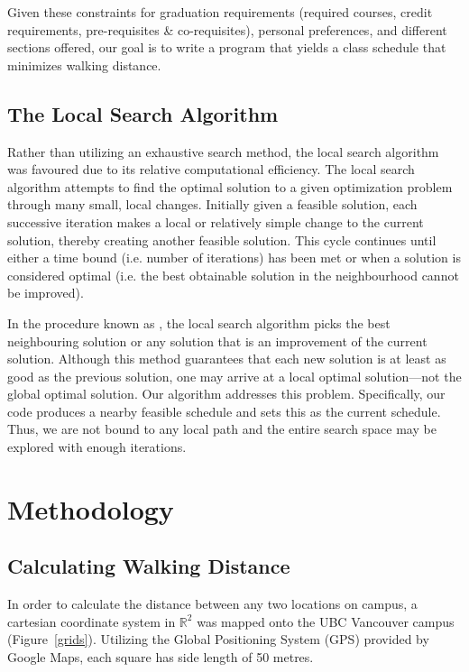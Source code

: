 \documentclass[11pt, oneside]{article}   	%
\begin{document}
Given these constraints for graduation requirements (required courses, credit requirements, pre-requisites \& co-requisites), personal preferences, and different sections offered, our goal is to write a program that yields a class schedule that minimizes walking distance.

\subsection{The Local Search Algorithm}

Rather than utilizing an exhaustive search method, the local search algorithm was favoured due to its relative computational efficiency. The local search algorithm attempts to find the optimal solution to a given optimization problem through many small, local changes. Initially given a feasible solution, each successive iteration makes a local or relatively simple change to the current solution, thereby creating another feasible solution. This cycle continues until either a time bound (i.e. number of iterations) has been met or when a solution is considered optimal (i.e. the best obtainable solution in the neighbourhood cannot be improved).

In the procedure known as , the local search algorithm picks the best neighbouring solution or any solution that is an improvement of the current solution. Although this method guarantees that each new solution is at least as good as the previous solution, one may arrive at a local optimal solution---not the global optimal solution. Our algorithm addresses this problem. Specifically, our code  produces a nearby feasible schedule and sets this as the current schedule. Thus, we are not bound to any local path and the entire search space may be explored with enough iterations.

\cleardoublepage
\section{Methodology}

\subsection{Calculating Walking Distance}
In order to calculate the distance between any two locations on campus, a cartesian coordinate system in $\mathbb{R}^2$ was mapped onto the UBC Vancouver campus (Figure~\ref{grids}). Utilizing the Global Positioning System (GPS) provided by Google Maps, each square has side length of 50 metres.
\end{document}
